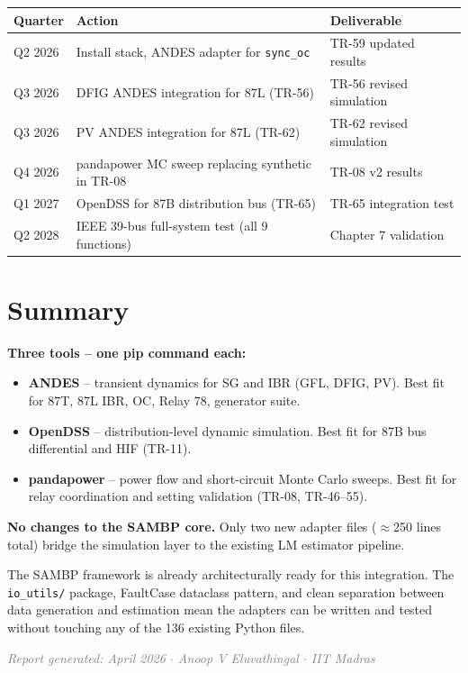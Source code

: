 \documentclass[11pt,a4paper]{article}
\begin{document}
\begin{center}
\begin{tabular}{lll}
\toprule
\textbf{Quarter} & \textbf{Action} & \textbf{Deliverable} \\
\midrule
Q2 2026 & Install stack, ANDES adapter for \texttt{sync\_oc}   & TR-59 updated results \\
Q3 2026 & DFIG ANDES integration for 87L (TR-56)                & TR-56 revised simulation \\
Q3 2026 & PV ANDES integration for 87L (TR-62)                  & TR-62 revised simulation \\
Q4 2026 & pandapower MC sweep replacing synthetic in TR-08       & TR-08 v2 results \\
Q1 2027 & OpenDSS for 87B distribution bus (TR-65)              & TR-65 integration test \\
Q2 2028 & IEEE 39-bus full-system test (all 9 functions)         & Chapter 7 validation \\
\bottomrule
\end{tabular}
\end{center}

\section{Summary}

\begin{infobox}
\textbf{Three tools -- one pip command each:}
\begin{itemize}[noitemsep]
\item \textbf{ANDES} -- transient dynamics for SG and IBR (GFL, DFIG, PV). Best fit for 87T, 87L IBR, OC, Relay 78, generator suite.
\item \textbf{OpenDSS} -- distribution-level dynamic simulation. Best fit for 87B bus differential and HIF (TR-11).
\item \textbf{pandapower} -- power flow and short-circuit Monte Carlo sweeps. Best fit for relay coordination and setting validation (TR-08, TR-46--55).
\end{itemize}
\textbf{No changes to the SAMBP core.} Only two new adapter files ($\approx$250 lines total) bridge the simulation layer to the existing LM estimator pipeline.
\end{infobox}

\vspace{1em}

The SAMBP framework is already architecturally ready for this integration.
The \texttt{io\_utils/} package, FaultCase dataclass pattern, and clean
separation between data generation and estimation mean the adapters
can be written and tested without touching any of the 136 existing
Python files.

\vfill
\begin{center}
\textcolor{gray}{\small\textit{Report generated: April 2026 $\cdot$ Anoop V Eluvathingal $\cdot$ IIT Madras}}
\end{center}
\end{document}
